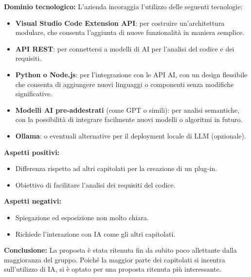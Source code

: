 \documentclass[10pt]{article}
\begin{document}
\textbf{Dominio tecnologico:}  
L’azienda incoraggia l’utilizzo delle seguenti tecnologie:
\begin{itemize}
    \item \textbf{Visual Studio Code Extension API}: per costruire un'architettura modulare, che consenta l'aggiunta di nuove funzionalità in maniera semplice.
    \item \textbf{API REST}: per connettersi a modelli di AI per l'analisi del codice e dei requisiti.
    \item \textbf{Python o Node.js}: per l'integrazione con le API AI, con un design flessibile che consenta di aggiungere nuovi linguaggi o componenti senza modifiche significative.
    \item \textbf{Modelli AI pre-addestrati} (come GPT o simili): per analisi semantiche, con la possibilità di integrare facilmente nuovi modelli o algoritmi in futuro.
    \item \textbf{Ollama}: o eventuali alternative per il deployment locale di LLM (opzionale).
\end{itemize}
\textbf{Aspetti positivi:}
\begin{itemize}
    \item Differenza rispetto ad altri capitolati per la creazione di un plug-in.
    \item Obiettivo di facilitare l’analisi dei requisiti del codice.
\end{itemize}
\textbf{Aspetti negativi:}
\begin{itemize}
    \item Spiegazione ed esposizione non molto chiara.
    \item Richiede l’interazione con IA come gli altri capitolati.
\end{itemize}
\textbf{Conclusione:}  
La proposta è stata ritenuta fin da subito poco allettante dalla maggioranza del gruppo. Poiché la maggior parte dei capitolati si incentra sull’utilizzo di IA, si è optato per una proposta ritenuta più interessante.
\end{document}
